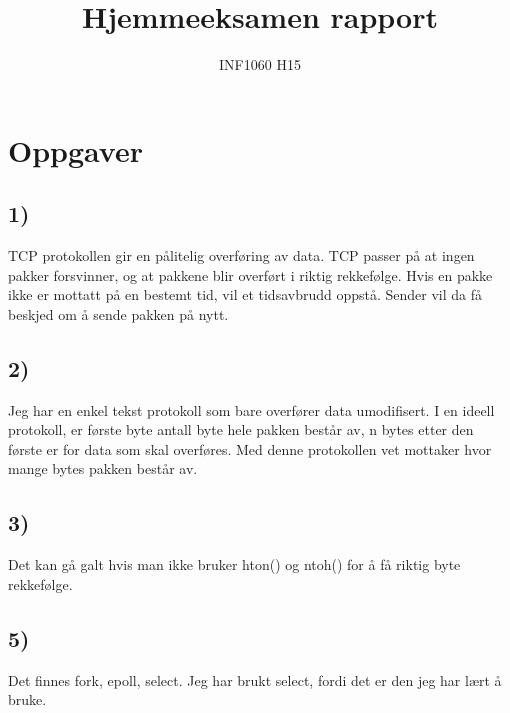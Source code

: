 \documentclass[11pt,a4paper,norsk]{article}
\title{\textbf{Hjemmeeksamen rapport}}
\author{INF1060 H15}
\begin{document}
\maketitle

\section*{Oppgaver}
\subsection*{1)}
TCP protokollen gir en pålitelig overføring av data. TCP passer på at ingen pakker forsvinner, og 
at pakkene blir overført i riktig rekkefølge. Hvis en pakke ikke er mottatt på en bestemt tid, vil 
et tidsavbrudd oppstå. Sender vil da få beskjed om å sende pakken på nytt.

\subsection*{2)}
Jeg har en enkel tekst protokoll som bare overfører data umodifisert. I en ideell protokoll, er 
første byte antall byte hele pakken består av, n bytes etter den første er for data som skal 
overføres. Med denne protokollen vet mottaker hvor mange bytes pakken består av.

\subsection*{3)}
Det kan gå galt hvis man ikke bruker hton() og ntoh() for å få riktig byte rekkefølge.



\subsection*{5)}
Det finnes fork, epoll, select. Jeg har brukt select, fordi det er den jeg har lært å bruke.
\end{document}

